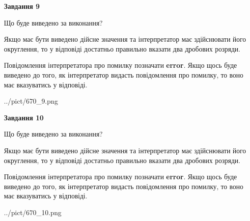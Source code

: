 \documentclass[12pt, ukrainian]{article}
\begin{document}
{\begin {Large}
{\begin {center}\textbf{Завдання 9}\end {center}}\par
Що буде виведено за виконання? \par

Якщо має бути виведено дійсне значення та інтерпретатор має здійснювати його округлення, 
то у відповіді достатньо правильно вказати два дробових розряди.

Повідомлення інтерпретатора про помилку позначати \textbf{error}.
Якщо щось буде виведено до того, як інтерпретатор видасть повідомлення про помилку, 
то воно має вказуватись у відповіді. \par

\begin{center}
	{../pict/670_9.png}
\end{center}
\newpage

{\begin {center}\textbf{Завдання 10}\end {center}}\par
Що буде виведено за виконання? \par

Якщо має бути виведено дійсне значення та інтерпретатор має здійснювати його округлення, 
то у відповіді достатньо правильно вказати два дробових розряди.

Повідомлення інтерпретатора про помилку позначати \textbf{error}.
Якщо щось буде виведено до того, як інтерпретатор видасть повідомлення про помилку, 
то воно має вказуватись у відповіді. \par

\begin{center}
	{../pict/670_10.png}
\end{center}
\newpage

\end {Large}}
\end{document}

